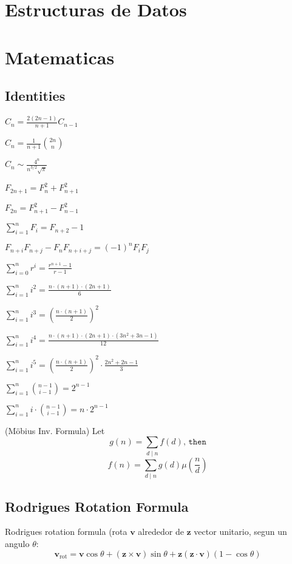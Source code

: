 \documentclass{article}
\begin{document}
\begin{multicols*}{2}
\section{Estructuras de Datos}

\section{Matematicas}
\subsection{Identities}
    $C_n = \frac{2(2n-1)}{n+1} C_{n-1}$

    $C_n = \frac{1}{n+1} \binom{2n}{n}$

    $C_n \sim \frac{4^n}{n^{3/2}\sqrt{\pi}}$

    $F_{2n+1} = F_{n}^2 + F_{n+1}^2$

    $F_{2n} = F_{n+1}^2 - F_{n-1}^2$

    $\sum_{i=1}^n F_i = F_{n+2}-1$

    $F_{n+i}F_{n+j} - F_nF_{n+i+j} = (-1)^n F_iF_j$

    $\sum_{i=0}^n{r^i} = \frac{r^{n+1}-1}{r-1}$
    
    $\sum_{i=1}^n{i^2} = \frac{n\cdot(n+1)\cdot(2n+1)}{6}$

    $\sum_{i=1}^n{i^3} = \left(\frac{n\cdot(n+1)}{2}\right)^2$

    $\sum_{i=1}^n{i^4} = \frac{n\cdot(n+1)\cdot(2n+1)\cdot(3n^2+3n-1)}{12}$

    $\sum_{i=1}^{ n} i^5 = \left(\frac{ n \cdot (n+1)}{2}\right) ^2 \cdot \frac{2 n ^2 + 2n - 1}{3}$

    $\sum_{i=1}^n{\binom{n-1}{i-1}} = 2^{n-1}$

    $\sum_{i=1}^n{i\cdot\binom{n-1}{i-1}} = n\cdot2^{n-1}$

    (Möbius Inv. Formula)
    Let
    \[g(n) = \sum_{d\mid n} f(d) \texttt{, then}\]
    \[f(n)=\sum_{d\mid n} g(d) \mu\left(\frac{n}{d}\right)\]


\subsection{Rodrigues Rotation Formula}
Rodrigues rotation formula (rota $\mathbf{v}$ alrededor de $\mathbf{z}$ vector unitario, segun un angulo $\theta$:
$$\mathbf{v}_\mathrm{rot} = \mathbf{v} \cos\theta + (\mathbf{z} \times \mathbf{v})\sin\theta   + \mathbf{z} (\mathbf{z} \cdot \mathbf{v}) (1 - \cos\theta)$$


\end{multicols*}
\end{document}
